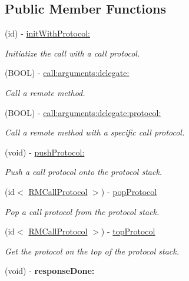 \subsection*{Public Member Functions}
\begin{DoxyCompactItemize}
\item 
(id) -\/ \hyperlink{interface_r_m_call_a64f1e76758d2d473859064c5b0c6c75d}{initWithProtocol:}
\begin{DoxyCompactList}\small\item\em Initiatize the call with a call protocol. \item\end{DoxyCompactList}\item 
(BOOL) -\/ \hyperlink{interface_r_m_call_a85bb3ac47600a313105a6f94c9ab7ec3}{call:arguments:delegate:}
\begin{DoxyCompactList}\small\item\em Call a remote method. \item\end{DoxyCompactList}\item 
(BOOL) -\/ \hyperlink{interface_r_m_call_ae6750e4bc12f50170b839e1b96227a87}{call:arguments:delegate:protocol:}
\begin{DoxyCompactList}\small\item\em Call a remote method with a specific call protocol. \item\end{DoxyCompactList}\item 
(void) -\/ \hyperlink{interface_r_m_call_afb23a22f89df78e62f45f2af2dd41623}{pushProtocol:}
\begin{DoxyCompactList}\small\item\em Push a call protocol onto the protocol stack. \item\end{DoxyCompactList}\item 
(id$<$ \hyperlink{protocol_r_m_call_protocol-p}{RMCallProtocol} $>$) -\/ \hyperlink{interface_r_m_call_a2f55cbd7d34e98e4dbc74e1d8d8facf8}{popProtocol}
\begin{DoxyCompactList}\small\item\em Pop a call protocol from the protocol stack. \item\end{DoxyCompactList}\item 
(id$<$ \hyperlink{protocol_r_m_call_protocol-p}{RMCallProtocol} $>$) -\/ \hyperlink{interface_r_m_call_a306021de3467cc71a876068cbed9d834}{topProtocol}
\begin{DoxyCompactList}\small\item\em Get the protocol on the top of the protocol stack. \item\end{DoxyCompactList}\item 
\hypertarget{interface_r_m_call_ad886fa1609a87c68a5d681942704e61d}{
(void) -\/ {\bfseries responseDone:}}
\label{interface_r_m_call_ad886fa1609a87c68a5d681942704e61d}


\end{DoxyCompactItemize}
